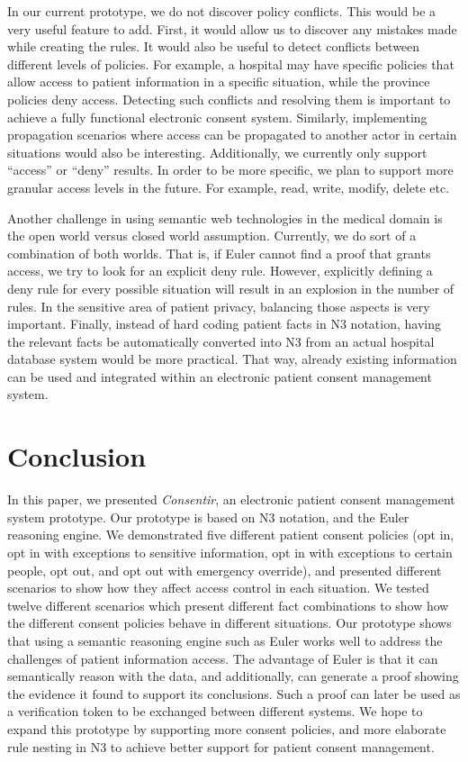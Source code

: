 \documentclass[conference]{IEEEtran}
\begin{document}
In our current prototype, we do not discover policy conflicts. This would be a very useful feature to add. First, it would allow us to discover any mistakes
made while creating the rules. It would also be useful to detect conflicts between different levels of policies. For example, a hospital may have specific
policies that allow access to patient information in a specific situation, while the province policies deny access. Detecting such conflicts and resolving them
is important to achieve a fully functional electronic consent system. Similarly, implementing propagation scenarios where access can be propagated to another
actor in certain situations would also be interesting. Additionally, we currently only support ``access'' or ``deny'' results. In order to be more
specific, we plan to support more granular access levels in the future. For example, read, write, modify, delete etc. 

Another challenge in using semantic web technologies in the medical domain is the open world versus closed world assumption. Currently, we do sort of a
combination of both worlds. That is, if Euler cannot find a proof that grants access, we try to look for an explicit deny rule. However, explicitly defining a
deny rule for every possible situation will result in an explosion in the number of rules. In the sensitive area of patient privacy, balancing those
aspects is very important. Finally, instead of hard coding patient
facts in N3 notation, having the relevant facts be automatically converted into N3 from an actual hospital database system would be more practical.
That way, already existing information can be used and integrated within an electronic patient consent management system.

\section{Conclusion}
\label{concl}

In this paper, we presented \textit{Consentir}, an electronic patient consent management system prototype. Our prototype is based on N3 notation, and the Euler
reasoning engine.
We demonstrated five different patient consent policies (opt in, opt in with exceptions to sensitive information, opt in with exceptions to certain people, opt
out, and opt out with emergency override), and presented different scenarios to show how they affect access control in each situation. We tested twelve
different scenarios which present different fact combinations to show how the different consent policies behave in different situations. Our prototype shows
that using a semantic reasoning engine such as Euler works well to address the challenges of patient information access. The advantage of Euler is that it can
semantically reason with the data, and additionally, can generate a proof showing the evidence it found to support its conclusions. Such a proof can later be
used as a verification token to be exchanged between different systems. We hope to expand this prototype by supporting more consent policies, and more
elaborate rule nesting in N3 to achieve better support for patient consent management.
\end{document}
